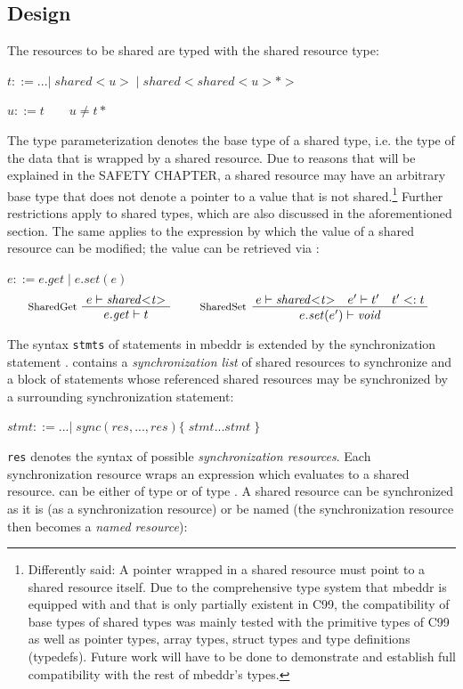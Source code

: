 \subsection{Design}
The resources to be shared are typed with the shared resource type:

$ t ::= ...|\;\mathit{shared{<}u{>}}\;|\;\mathit{shared{<}shared{<}u{>}{*}{>}}\;$

$ u ::= t \qquad u \neq t*$

The type parameterization denotes the base type of a shared type, i.e. the type of the data that is wrapped by a shared resource. Due to reasons that will be explained in the SAFETY CHAPTER, a shared resource may have an arbitrary base type that does not denote a pointer to a value that is not shared.\footnote{Differently said: A pointer wrapped in a shared resource must point to a shared resource itself. Due to the comprehensive type system that mbeddr is equipped with and that is only partially existent in C99, the compatibility of base types of shared types was mainly tested with the primitive types of C99 as well as pointer types, array types, struct types and type definitions (typedefs). Future work will have to be done to demonstrate and establish full compatibility with the rest of mbeddr's types.} Further restrictions apply to shared types, which are also discussed in the aforementioned section. The same applies to the  expression by which the value of a shared resource can be modified; the value can be retrieved via :

$ e ::= e.\mathit{get}\;|\;e.\mathit{set(e)} $
\begin{align*}
\inference*[SharedGet]{e |- \mathit{shared{<}t{>}}} {\quad e.\mathit{get} |- t \quad}
\qquad
\inference*[SharedSet]{e |- \mathit{shared{<}t{>}} \quad e' |- t' \quad t' <: t} {\qquad\quad e.\mathit{set}(e') |- \mathit{void} \quad\qquad} 
\end{align*}

The syntax \texttt{stmts} of statements in mbeddr is extended by the synchronization statement .  contains a \textit{synchronization list} of shared resources to synchronize and a block of statements whose referenced shared resources may be synchronized by a surrounding synchronization statement:

$ \mathit{stmt} ::= ...
        |\;\mathit{sync}(res, ..., res) \{\;\mathit{stmt} ... \mathit{stmt}\;\}$
        
\texttt{res} denotes the syntax of possible \textit{synchronization resources}. Each synchronization resource  wraps an expression  which evaluates to a shared resource.  can be either of type  or of type . A shared resource can be synchronized as it is (as a synchronization resource) or be named (the synchronization resource then becomes a \textit{named resource}):

